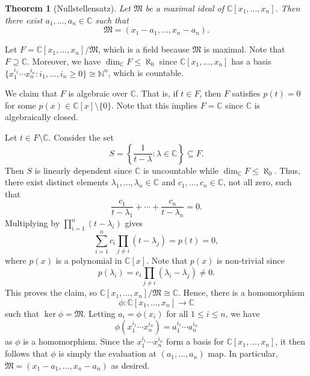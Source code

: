 \documentclass[10pt]{article}
\makeatletter
\numberwithin{equation}{section}
\newcommand{\C}{\mathbb{C}}
\newcommand{\N}{\mathbb{N}}
\theoremstyle{newstyle}
\newtheorem{thm}{Theorem}[section]
\newenvironment{pf}[1][\proofname]{\par
  \pushQED{\qed}%
  \normalfont \topsep0\p@\relax
  \trivlist
  \item[\hskip\labelsep\scshape
  #1\@addpunct{.}]\ignorespaces
}{%
  \popQED\endtrivlist\@endpefalse
}
\makeatother
\begin{document}
\begin{thm}[Nullstellensatz]
Let $\mathfrak{M}$ be a maximal ideal of $\C[x_1, \dots, x_n]$. Then there exist 
$a_1, \dots, a_n \in \C$ such that 
\[ \mathfrak M = (x_1-a_1, \dots, x_n-a_n). \]
\end{thm}
\begin{pf}
Let $F = \C[x_1, \dots, x_n]/\mathfrak M$, which is a field because $\mathfrak M$ is maximal. 
Note that $F \supseteq \C$. Moreover, we have $\dim_{\C} F \leq \aleph_0$ since 
$\C[x_1, \dots, x_n]$ has a basis $\{x_1^{i_1} \cdots x_n^{i_n} : i_1, \dots, i_n \geq 0\} 
\cong \N^n$, which is countable. 

We claim that $F$ is algebraic over $\C$. That is, if $t \in F$, then $F$ satisfies $p(t) = 0$ 
for some $p(x) \in \C[x] \setminus \{0\}$. Note that this implies $F = \C$ since $\C$ is 
algebraically closed. 

Let $t \in F \setminus \C$. Consider the set 
\[ S = \left\{ \frac1{t-\lambda} : \lambda \in \C\right\} \subseteq F. \] 
Then $S$ is linearly dependent since $\C$ is uncountable while $\dim_\C F \leq \aleph_0$. 
Thus, there exist distinct elements $\lambda_1, \dots, \lambda_n \in \C$ and $c_1, \dots, c_n 
\in \C$, not all zero, such that 
\[ \frac{c_1}{t - \lambda_1} + \cdots + \frac{c_n}{t - \lambda_n} = 0. \]
Multiplying by $\prod_{i=1}^n (t - \lambda_i)$ gives 
\[ \sum_{i=1}^n c_i \prod_{j\neq i} (t - \lambda_j) = p(t) = 0, \]
where $p(x)$ is a polynomial in $\C[x]$. Note that $p(x)$ is non-trivial since 
\[ p(\lambda_i) = c_i \prod_{j\neq i} (\lambda_i - \lambda_j) \neq 0. \]
This proves the claim, so $\C[x_1, \dots, x_n]/\mathfrak M \cong \C$. Hence, there is a homomorphism 
\[ \phi : \C[x_1, \dots, x_n] \to \C \] 
such that $\ker\phi = \mathfrak M$. Letting $a_i = \phi(x_i)$ for all $1 \leq i \leq n$, we have 
\[ \phi(x_1^{i_1} \cdots x_n^{i_n}) = a_1^{i_1} \cdots a_n^{i_n} \]
as $\phi$ is a homomorphism. Since the $x_1^{i_1} \cdots x_n^{i_n}$ form a basis for 
$\C[x_1, \dots, x_n]$, it then follows that $\phi$ is simply the evaluation at 
$(a_1, \dots, a_n)$ map. In particular, $\mathfrak M = (x_1 - a_1, \dots, x_n - a_n)$ as desired.
\end{pf}
\end{document}
